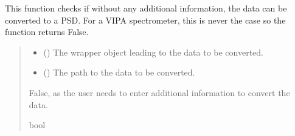 \documentclass[letterpaper,10pt,english]{sphinxmanual}
\begin{document}
\begin{fulllineitems}
\label{\detokenize{_autosummary/HDF5_BLS.conversion_PSD:HDF5_BLS.conversion_PSD.check_conversion_VIPA}}
\pysigstartsignatures
\pysiglinewithargsret
{}
{\sphinxparamcomma {}}
{}
\pysigstopsignatures
\sphinxAtStartPar
This function checks if without any additional information, the data can be converted to a PSD. For a VIPA spectrometer, this is never the case so the function returns False.
\begin{quote}\begin{description}
\begin{itemize}
\item {} 
\sphinxAtStartPar
{} ({\hyperref[\detokenize{_autosummary/HDF5_BLS.wrapper:HDF5_BLS.wrapper.Wrapper}]{}}) \textendash{} The wrapper object leading to the data to be converted.

\item {} 
\sphinxAtStartPar
{} () \textendash{} The path to the data to be converted.

\end{itemize}

\sphinxAtStartPar
False, as the user needs to enter additional information to convert the data.

\sphinxAtStartPar
bool

\end{description}\end{quote}

\end{fulllineitems}

\end{document}
